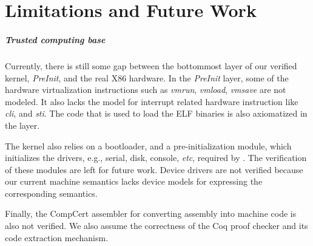 \chapter{Limitations and Future Work}
\label{chap-limits}


\paragraph{Trusted computing base}
Currently, there is still some gap between the bottommost layer of our
verified kernel, {\it PreInit}, and the real X86 hardware.
In the {\it PreInit} layer, some of the hardware virtualization
instructions such as {\it vmrun}, {\it vmload}, {\it vmsave}
are not modeled. It also lacks the model for interrupt related hardware
instruction like {\it cli}, and {\it sti}. The code that
is used to load the ELF binaries is also axiomatized in the layer.

The \mCTOS{} kernel also relies on a bootloader, and a pre-initialization
module, which initializes the drivers, e.g.,
serial, disk, console, {\it etc}, required by \mCTOS{}.
The verification of these modules are
left for future work. Device drivers are not verified
because our current machine semantics lacks device models for
expressing the corresponding semantics.

Finally, the CompCert assembler for converting assembly into machine
code is also not verified. We also assume the correctness of the Coq
proof checker and its code extraction mechanism.

